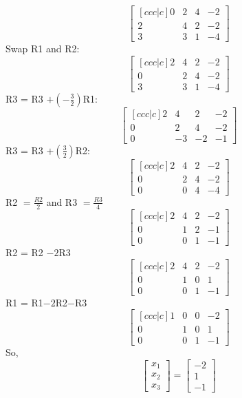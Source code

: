 \documentclass{article}
\begin{document}
\begin{aprob}
\begin{enumerate}
        \[ \begin{bmatrix}[ccc|c] 0 & 2 & 4 & -2\\ 2 & 4 & 2 &-2\\ 3 & 3 & 1 &-4\end{bmatrix}\]
        Swap R1 and R2:
        \[ \begin{bmatrix}[ccc|c] 2 & 4 & 2 &-2\\ 0 & 2 & 4 & -2\\ 3 & 3 & 1 &-4\end{bmatrix}\]
        R3 = R3 $+ (-\frac{3}{2})$R1:
        \[ \begin{bmatrix}[ccc|c] 2 & 4 & 2 &-2\\ 0 & 2 & 4 & -2\\ 0 & -3 & -2 &-1 \end{bmatrix}\]
        R3 = R3 $+ (\frac{3}{2})$R2:
        \[ \begin{bmatrix}[ccc|c] 2 & 4 & 2 &-2\\ 0 & 2 & 4 & -2\\ 0 & 0 & 4 &-4 \end{bmatrix}\]
        R2 $= \frac{R2}{2}$ and R3 $= \frac{R3}{4}$
        \[ \begin{bmatrix}[ccc|c] 2 & 4 & 2 &-2\\ 0 & 1 & 2 & -1\\ 0 & 0 & 1 &-1 \end{bmatrix}\]
        R2 = R2 $- 2$R3
        \[ \begin{bmatrix}[ccc|c] 2 & 4 & 2 &-2\\ 0 & 1 & 0 & 1\\ 0 & 0 & 1 &-1 \end{bmatrix}\]
        R1 = R1$-2$R2$-$R3
        \[ \begin{bmatrix}[ccc|c] 1 & 0 & 0 &-2\\ 0 & 1 & 0 & 1\\ 0 & 0 & 1 &-1 \end{bmatrix}\]
        So,
        \[\begin{bmatrix} x_1 \\ x_2 \\ x_3 \end{bmatrix} = \begin{bmatrix} -2 \\ 1 \\ -1 \end{bmatrix} \]
    \end{enumerate}
\end{aprob}
\end{document}
